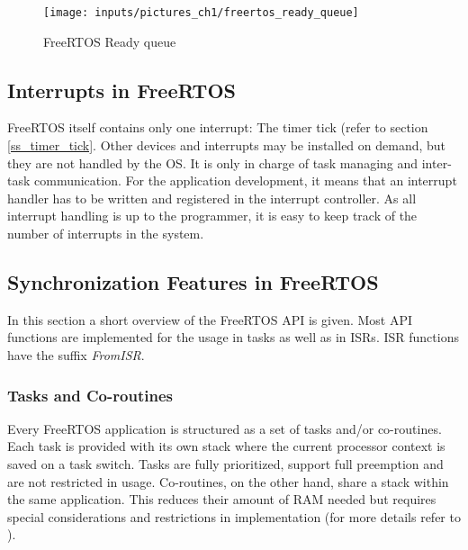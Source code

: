 \begin{figure}[htb]
	\begin{center}
		\texttt{[image: inputs/pictures\_ch1/freertos\_ready\_queue]}
	\end{center}
	\caption[FreeRTOS Ready queue]{FreeRTOS Ready queue \cite{dev:taoosa}} \label{fig_freertos_ready_queue}
\end{figure}

\subsection{Interrupts in FreeRTOS}\label{ss_interrupts_in_freertos}
FreeRTOS itself contains only one interrupt: The timer tick (refer to section \ref{ss_timer_tick}.
Other devices and interrupts may be installed on demand, but they are not handled by the OS. 
It is only in charge of task managing and inter-task communication.
For the application development, it means that an interrupt handler has to be written and registered in the interrupt controller.
As all interrupt handling is up to the programmer, it is easy to keep track of the number of interrupts in the system.

\subsection{Synchronization Features in FreeRTOS}
In this section a short overview of the FreeRTOS \ac{API} is given.
Most \ac{API} functions are implemented for the usage in tasks as well as in \acp{ISR}.
\ac{ISR} functions have the suffix \textit{FromISR}.

\subsubsection{Tasks and Co-routines}
Every FreeRTOS application is structured as a set of tasks and/or co-routines.
Each task is provided with its own stack where the current processor context is saved on a task switch.
Tasks are fully prioritized, support full preemption and are not restricted in usage.
Co-routines, on the other hand, share a stack within the same application. 
This reduces their amount of \ac{RAM} needed but requires special considerations and restrictions in implementation (for more details refer to \cite{freertos_coroutines_tasks}).


